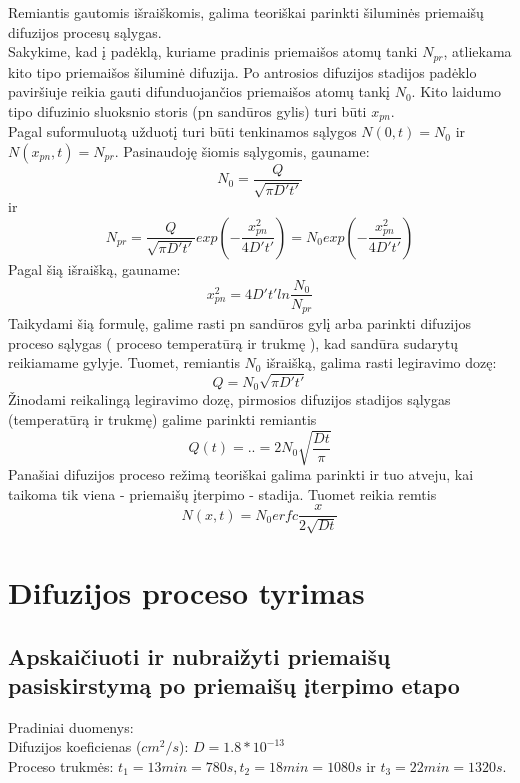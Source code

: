 \documentclass[11pt,a4paper]{article}
\begin{document}
Remiantis gautomis išraiškomis, galima teoriškai parinkti šiluminės priemaišų difuzijos procesų sąlygas.\\

Sakykime, kad į padėklą, kuriame pradinis priemaišos atomų tanki $N_{pr}$, atliekama kito tipo priemaišos šiluminė difuzija. Po antrosios difuzijos stadijos padėklo paviršiuje reikia gauti difunduojančios priemaišos atomų tankį
 $N_0$. Kito laidumo tipo difuzinio sluoksnio storis (pn sandūros gylis) turi būti $x_{pn}$.\\
 
Pagal suformuluotą užduotį turi būti tenkinamos sąlygos $N(0,t) = N_0$ ir $N(x_{pn},t) = N_{pr}$. Pasinaudoję šiomis sąlygomis, gauname:
\begin{equation}
N_0 = \frac{Q}{\sqrt{\pi D't'}}
\end{equation}
ir
\begin{equation}
N_{pr} = \frac{Q}{\sqrt{\pi D't'}}exp \left ( - \frac{x^2_{pn}}{4D't'} \right ) = N_0 exp \left ( - \frac{x^2_{pn}}{4D't'} \right ) 
\end{equation}
Pagal šią išraišką, gauname:
\begin{equation}
x^2_{pn} = 4D't'ln \frac{N_0}{N_{pr}}
\end{equation}
Taikydami šią formulę, galime rasti pn sandūros gylį arba parinkti difuzijos proceso sąlygas ( proceso temperatūrą ir trukmę ), kad sandūra sudarytų reikiamame gylyje. Tuomet, remiantis $N_0$ išraišką, galima rasti legiravimo dozę:
\begin{equation}
Q = N_{0}\sqrt{\pi D't'}
\end{equation}
Žinodami reikalingą legiravimo dozę, pirmosios difuzijos stadijos sąlygas (temperatūrą ir trukmę) galime parinkti remiantis
\begin{equation}
Q(t) = .. = 2N_0 \sqrt{\frac{Dt}{\pi}}
\end{equation}
Panašiai difuzijos proceso režimą teoriškai galima parinkti ir tuo atveju, kai taikoma tik viena - priemaišų įterpimo - stadija. Tuomet reikia remtis
\begin{equation}
N(x,t) = N_0 erfc\frac{x}{2 \sqrt{Dt}}
\end{equation}


\section{Difuzijos proceso tyrimas}
\subsection{Apskaičiuoti ir nubraižyti priemaišų pasiskirstymą po priemaišų įterpimo etapo}
Pradiniai duomenys:\\
Difuzijos koeficienas ($cm^2/s$): $D = 1.8*10^{-13}$\\
Proceso trukmės: $t_1 = 13min = 780s, t_2 = 18min = 1080s$ ir $t_3 = 22min = 1320s$.\\
\end{document}
